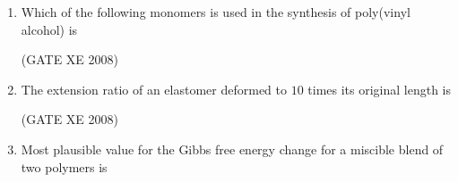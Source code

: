 \documentclass[12pt]{article}
\begin{document}
\begin{enumerate}
\begin{enumerate}
\end{enumerate}

(GATE XE 2008)

\item Which of the following monomers is used in the synthesis of poly(vinyl alcohol) is  

\begin{enumerate}
\end{enumerate}

(GATE XE 2008)

\item The extension ratio of an elastomer deformed to $10$ times its original length is  

\begin{enumerate}
\end{enumerate}

(GATE XE 2008)

\item Most plausible value for the Gibbs free energy change for a miscible blend of two polymers is  

\begin{enumerate}
\end{enumerate}


\end{enumerate}
\end{document}
